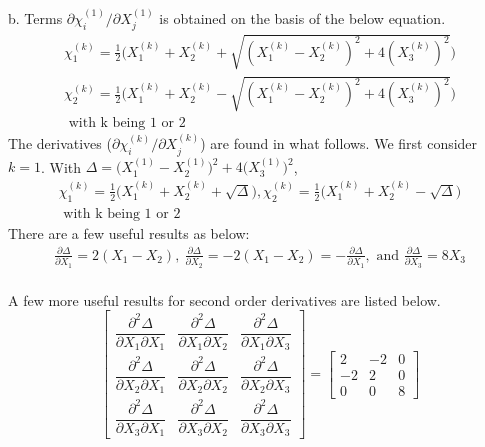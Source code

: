 \documentclass[12pt]{amsart}
\begin{document}
b. Terms $\partial\chi^{(1)}_i/\partial X^{(1)}_j$ is obtained on the basis of the below equation.
\begin{equation}
  \label{eq:princ}
  \begin{split}
    \chi_1^{(k)}=\frac{1}{2}\bigg(X_1^{(k)}+X_2^{(k)}+\sqrt{(X_1^{(k)}-X_2^{(k)})^2+4(X_3^{(k)})^2}\bigg)\\
    \chi_2^{(k)}=\frac{1}{2}\bigg(X_1^{(k)}+X_2^{(k)}-\sqrt{(X_1^{(k)}-X_2^{(k)})^2+4(X_3^{(k)})^2}\bigg)\\
    \text{ with k being 1 or 2}
  \end{split}
\end{equation}
The derivatives ($\partial\chi_i^{(k)}/\partial X_j^{(k)}$) are found in what follows.
We first consider $k=1$.
With $\Delta=\big(X^{(1)}_1-X^{(1)}_2\big)^2 +4\big(X^{(1)}_3\big)^2$,
\begin{equation}
  \label{eq:princ1}
  \begin{split}
    \chi_1^{(k)}=\frac{1}{2}\bigg(X_1^{(k)}+X_2^{(k)}+\sqrt{\Delta}\bigg), \chi_2^{(k)}=\frac{1}{2}\bigg(X_1^{(k)}+X_2^{(k)}-\sqrt{\Delta}\bigg)\\
    \text{ with k being 1 or 2}
  \end{split}
\end{equation}
There are a few useful results as below:
\begin{equation}
  \label{eq:princ2}
  \begin{split}
    \frac{\partial\Delta}{\partial X_1}=2(X_1-X_2),\ \frac{\partial\Delta}{\partial X_2}=-2(X_1-X_2)=-\frac{\partial\Delta}{\partial X_1},\text{ and } \frac{\partial\Delta}{\partial X_3}=8X_3\\
  \end{split}
\end{equation}

A few more useful results for second order derivatives are listed below.
\begin{equation}
  \label{eq:princ3}
  \begin{bmatrix}
    \dfrac{\partial^2\Delta}{\partial X_1 \partial X_1} & \dfrac{\partial^2\Delta}{\partial X_1 \partial X_2} & \dfrac{\partial^2\Delta}{\partial X_1 \partial X_3} \\
    \dfrac{\partial^2\Delta}{\partial X_2 \partial X_1} & \dfrac{\partial^2\Delta}{\partial X_2 \partial X_2} & \dfrac{\partial^2\Delta}{\partial X_2 \partial X_3} \\
    \dfrac{\partial^2\Delta}{\partial X_3 \partial X_1} & \dfrac{\partial^2\Delta}{\partial X_3 \partial X_2} & \dfrac{\partial^2\Delta}{\partial X_3 \partial X_3}
  \end{bmatrix}
  =
  \begin{bmatrix}
    2& -2& 0\\
   -2&  2& 0\\
    0&  0& 8
  \end{bmatrix}
\end{equation}
\end{document}
